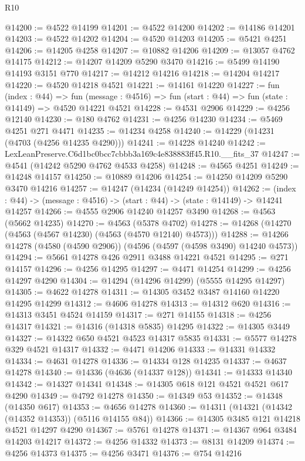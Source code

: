 \begin{lexlean}{R10}
\begin{coremodule}
@14200 := @4522 @14199
@14201 := @4522 @14200
@14202 := @14186 @14201
@14203 := @4522 @14202
@14204 := @4520 @14203
@14205 := @5421 @4251
@14206 := @14205 @4258
@14207 := @10882 @14206
@14209 := @13057 @4762 @14175
@14212 := @14207 @14209 @5290 @3470
@14216 := @5499 @14190 @14193 @3151 @770
@14217 := @14212 @14216
@14218 := @14204 @14217
@14220 := @4520 @14218 @4521
@14221 := @14161 @14220
@14227 := fun (index : @44) =>
  fun (message : @4516) => fun (start : @44) => fun (state : @14149) => @4520 @14221 @4521
@14228 := @4531 @2906
@14229 := @4256 @12140
@14230 := @180 @4762
@14231 := @4256 @14230
@14234 := @5469 @4251 @271 @4471
@14235 := @14234 @4258
@14240 := @14229 (@14231 (@4703 (@4256 @14235 @4290)))
@14241 := @14228 @14240
@14242 := LexLeanPreserve.C6d1bc0bcc7cbbb3a169c4e838883ff45.R10.__fits_37
@14247 := @4541 (@14242 @5290 @4762 @4533 @4258)
@14248 := @4565 @4251
@14249 := @14248 @14157
@14250 := @10889 @14206
@14254 := @14250 @14209 @5290 @3470 @14216
@14257 := @14247 (@14234 (@14249 @14254))
@14262 := (index : @44) -> (message : @4516) -> (start : @44) -> (state : @14149) -> @14241 @14257
@14266 := @4555 @2906 @14240 @14257 @3490
@14268 := @4563 (@5662 @14235)
@14270 := @4563 (@5378 @4702)
@14278 := @14268 (@14270 (@4563 (@4567 @14230) (@4563 (@4570 @12140) @4573)))
@14288 := @14266 @14278 (@4580 (@4590 @2906)) (@4596 (@4597 (@4598 @3490) @14240 @4573))
@14294 := @5661 @14278 @426 @2911 @3488 @14221 @4521
@14295 := @271 @14157
@14296 := @4256 @14295
@14297 := @4471 @14254
@14299 := @4256 @14297 @4290
@14304 := @14294 (@14296 @14299) (@5555 @14295 @14297)
@14305 := @4622 @14278
@14311 := @14305 @3452 @3487 @14160 @14220 @14295 @14299
@14312 := @4606 @14278
@14313 := @14312 @620
@14316 := @14313 @3451 @4524 @14159
@14317 := @271 @14155
@14318 := @4256 @14317
@14321 := @14316 (@14318 @5835) @14295
@14322 := @14305 @3449
@14327 := @14322 @650 @4521 @4523 @14317 @5835
@14331 := @5577 @14278 @329 @4521 @14317
@14332 := @4471 @14206
@14333 := @14331 @14332
@14334 := @4631 @14278
@14336 := @14334 @128 @14235
@14337 := @4637 @14278
@14340 := @14336 (@4636 (@14337 @128))
@14341 := @14333 @14340
@14342 := @14327 @14341
@14348 := @14305 @618 @121 @4521 @4521 @617 @4290
@14349 := @4792 @14278
@14350 := @14349 @53
@14352 := @14348 (@14350 @617)
@14353 := @4656 @14278
@14360 := @14311 (@14321 (@14342 (@14352 @14353)) (@5116 @14155 @84))
@14366 := @14305 @3485 @121 @14218 @4521 @14297 @4290
@14367 := @5761 @14278
@14371 := @14367 @964 @3484 @14203 @14217
@14372 := @4256 @14332
@14373 := @8131 @14209
@14374 := @4256 @14373
@14375 := @4256 @3471
@14376 := @754 @14216

\end{coremodule}
\end{lexlean}
